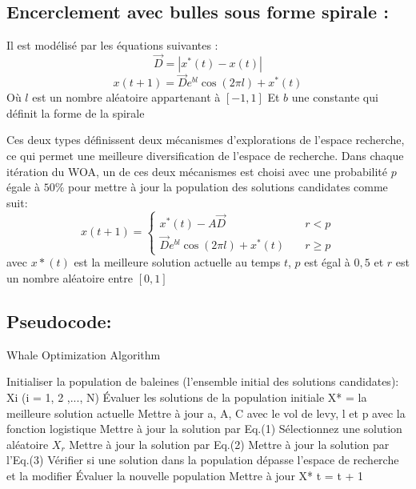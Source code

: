 \documentclass[12pt]{article}
\begin{document}
\subsection{Encerclement avec bulles sous forme spirale :}
Il est modélisé par les équations suivantes :
\begin{equation}
    \vec{D} = |x^*(t) - x(t)|
\end{equation}
\begin{equation}
    x(t+1) = \vec{D} e^{bl} \cos (2\pi l) + x^*(t)
\end{equation}
Où \(l\) est un nombre aléatoire appartenant à \([-1,1]\) Et \(b\) une constante qui définit la forme de la spirale 

Ces deux types définissent deux mécanismes d’explorations de l’espace recherche, ce qui permet une meilleure diversification de l’espace de recherche.
Dans chaque itération du WOA, un de ces deux mécanismes est choisi avec une probabilité \(p\) égale à \(50\%\) pour mettre à jour la population des solutions candidates comme suit:
\[ x(t+1) =
  \begin{cases}
    x^*(t) - A\vec{D}       & \quad r < p\\
    \vec{D} e^{bl} \cos (2\pi l) + x^*(t)  & \quad r \geq p
  \end{cases}
\]
avec \(x*(t)\) est la meilleure solution actuelle au temps \(t\), \(p\) est égal à \(0,5\) et \(r\) est un nombre aléatoire entre \([0, 1]\)

\subsection{Pseudocode:}
\begin{algorithm}[H]
    \caption{Whale Optimization Algorithm}
    \begin{algorithmic}
        \STATE Initialiser la population de baleines (l'ensemble initial des solutions candidates): Xi (i = 1, 2 ,..., N)\;
        \STATE Évaluer les solutions de la population initiale\;
        \STATE X* = la meilleure solution actuelle\;
                \STATE Mettre à jour a, A, C avec le vol de levy, l et p avec la fonction logistique\;
                        \STATE Mettre à jour la solution par Eq.(1)\;
                    \ELSE
                        \STATE Sélectionnez une solution aléatoire \(X_r\)\;
                        \STATE Mettre à jour la solution par Eq.(2)\;
                    \ENDIF
                \ELSE 
                    \STATE Mettre à jour la solution par l'Eq.(3)\;
                \ENDIF
            \ENDFOR
            \STATE Vérifier si une solution dans la population dépasse l'espace de recherche et la modifier\;
            \STATE Évaluer la nouvelle population\;
            \STATE Mettre à jour X* \;
            \STATE t = t + 1\;
        \ENDWHILE
    \end{algorithmic}
\end{algorithm}
\end{document}
